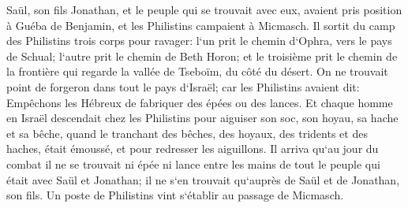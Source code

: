 \verse Saül, son fils Jonathan, et le peuple qui se trouvait avec eux, avaient pris position à Guéba de Benjamin, et les Philistins campaient à Micmasch. 
\verse Il sortit du camp des Philistins trois corps pour ravager: l`un prit le chemin d`Ophra, vers le pays de Schual; 
\verse l`autre prit le chemin de Beth Horon; et le troisième prit le chemin de la frontière qui regarde la vallée de Tseboïm, du côté du désert. 
\verse On ne trouvait point de forgeron dans tout le pays d`Israël; car les Philistins avaient dit: Empêchons les Hébreux de fabriquer des épées ou des lances. 
\verse Et chaque homme en Israël descendait chez les Philistins pour aiguiser son soc, son hoyau, sa hache et sa bêche, 
\verse quand le tranchant des bêches, des hoyaux, des tridents et des haches, était émoussé, et pour redresser les aiguillons. 
\verse Il arriva qu`au jour du combat il ne se trouvait ni épée ni lance entre les mains de tout le peuple qui était avec Saül et Jonathan; il ne s`en trouvait qu`auprès de Saül et de Jonathan, son fils. 
\verse Un poste de Philistins vint s`établir au passage de Micmasch. 

\chapter{}

